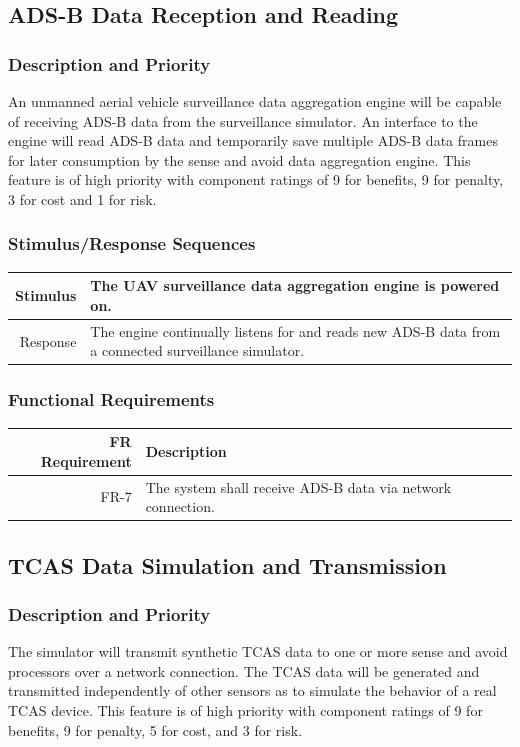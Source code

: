 \documentclass[12pt,oneside,letterpaper]{article}
\begin{document}
\subsection{ADS-B Data Reception and Reading}
\subsubsection{Description and Priority}
An unmanned aerial vehicle surveillance data aggregation engine will be capable of receiving ADS-B data from the surveillance simulator. An interface to the engine will read ADS-B data and temporarily save multiple ADS-B data frames for later consumption by the sense and avoid data aggregation engine. This feature is of high priority with component ratings of 9 for benefits, 9 for penalty, 3 for cost and 1 for risk.
\subsubsection{Stimulus/Response Sequences}
\begin{longtable}{|r|p{3.8in}|}
\hline
Stimulus & The UAV surveillance data aggregation engine is powered on. \\
\hline
Response & The engine continually listens for and reads new ADS-B data from a connected surveillance simulator. \\
\hline
\end{longtable}
\subsubsection{Functional Requirements}
\begin{longtable}{|r|p{3.8in}|}
\hline
FR Requirement & Description \\
\hline
FR-7 & The system shall receive ADS-B data via network connection. \\
\hline
\end{longtable}

\subsection{TCAS Data Simulation and Transmission}
\subsubsection{Description and Priority}
The simulator will transmit synthetic TCAS data to one or more sense and avoid processors over a network connection. The TCAS data will be generated and transmitted independently of other sensors as to simulate the behavior of a real TCAS device. This feature is of high priority with component ratings of 9 for benefits, 9 for penalty, 5 for cost, and 3 for risk.
\end{document}
